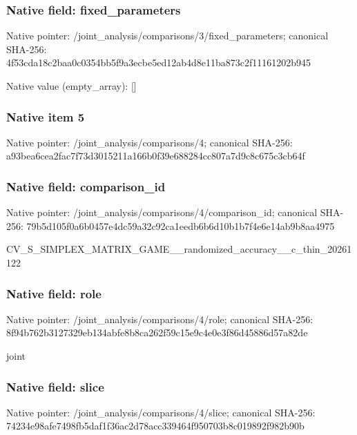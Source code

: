 \documentclass[10pt,a4paper]{article}
\begin{document}
\subsubsection{Native field: fixed\_parameters}


Native pointer: /joint\_analysis/comparis\allowbreak{}ons/3/fixed\_parameters; canonical SHA-256: 4f53cda18c2baa0c0354bb5f\allowbreak{}9a3ecbe5ed12ab4d8e11ba87\allowbreak{}3c2f11161202b945



Native value (empty\_array): []



\subsubsection{Native item 5}


Native pointer: /joint\_analysis/comparisons/4; canonical SHA-256: a93bea6cea2fac7f73d30152\allowbreak{}11a166b0f39e688284cc807a\allowbreak{}7d9c8c675c3cb64f



\subsubsection{Native field: comparison\_id}


Native pointer: /joint\_analysis/comparis\allowbreak{}ons/4/comparison\_id; canonical SHA-256: 79b5d105f0a6b0457e4dc59a\allowbreak{}32c92ca1eedb6b6d10b1b7f4\allowbreak{}e6e14ab9b8aa4975


CV\_S\_SIMPLEX\_MATRIX\_GAME\allowbreak{}\_\_randomized\_accuracy\_\_c\allowbreak{}\_thin\_20261122


\subsubsection{Native field: role}


Native pointer: /joint\_analysis/comparisons/4/role; canonical SHA-256: 8f94b762b3127329eb134abf\allowbreak{}e8b8ca262f59c15e9c4e0e3f\allowbreak{}86d45886d57a82de


joint


\subsubsection{Native field: slice}


Native pointer: /joint\_analysis/comparisons/4/slice; canonical SHA-256: 74234e98afe7498fb5daf1f3\allowbreak{}6ac2d78acc339464f950703b\allowbreak{}8c019892f982b90b
\end{document}
